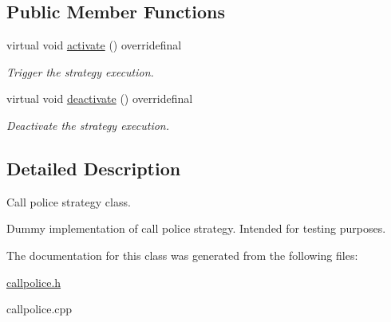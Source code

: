 \subsection*{Public Member Functions}
\begin{DoxyCompactItemize}
\item 
virtual void \hyperlink{classCallPolice_aaeaef1c5e5895b0a318da22155ae3dfd}{activate} () overridefinal\hypertarget{classCallPolice_aaeaef1c5e5895b0a318da22155ae3dfd}{}\label{classCallPolice_aaeaef1c5e5895b0a318da22155ae3dfd}

\begin{DoxyCompactList}\small\item\em Trigger the strategy execution. \end{DoxyCompactList}\item 
virtual void \hyperlink{classCallPolice_a93865c99711e577e4391a9851b6e804a}{deactivate} () overridefinal\hypertarget{classCallPolice_a93865c99711e577e4391a9851b6e804a}{}\label{classCallPolice_a93865c99711e577e4391a9851b6e804a}

\begin{DoxyCompactList}\small\item\em Deactivate the strategy execution. \end{DoxyCompactList}\end{DoxyCompactItemize}


\subsection{Detailed Description}
Call police strategy class. 

Dummy implementation of call police strategy. Intended for testing purposes. 

The documentation for this class was generated from the following files\+:\begin{DoxyCompactItemize}
\item 
\hyperlink{callpolice_8h}{callpolice.\+h}\item 
callpolice.\+cpp\end{DoxyCompactItemize}
